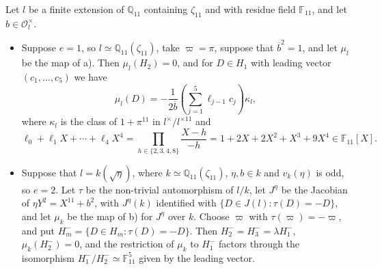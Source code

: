\documentclass[11pt,reqno]{amsart}
\newcommand{\Q}{\mathbb{Q}}
\newcommand{\F}{\mathbb{F}}
\newcommand{\OO}{\mathcal{O}}
\theoremstyle{definition}
\numberwithin{equation}{section}
\begin{document}
\begin{lemma}\label{lem:kummer_formal}
Let $l$ be a finite extension of $\Q_{11}$ containing $\zeta_{11}$ and with residue field $\F_{11}$, and let $b\in\OO_l^\times$.
\begin{itemize}
\item[a)] Suppose $e=1$, so $l\simeq\Q_{11}(\zeta_{11})$, take $\varpi=\pi$, suppose that $\overline b^2=1$, and let $\mu_l$ be the map of  a). Then $\mu_l(H_2)=0$, and for $D\in H_1$ with leading vector $(c_1,\ldots,c_5)$ we have
$$\mu_l(D)=-\frac{1}{2\overline b}\left(\sum_{j=1}^5 \ell_{j-1}c_j\right)\kappa_l,$$
where $\kappa_l$ is the class of $1+\pi^{11}$ in $l^\times/l^{\times 11}$ and
$$\ell_0+\ell_1X+\cdots+\ell_4X^4=\prod_{h\in\{2,3,4,8\}}\frac{X-h}{-h}=1+2X+2X^2+X^3+9X^4\in\F_{11}[X].$$
\item[b)] Suppose that $l=k(\sqrt\eta)$, where $k\simeq\Q_{11}(\zeta_{11})$, $\eta,b\in k$ and $v_k(\eta)$ is odd, so $e=2$. Let $\tau$ be the non-trivial automorphism of $l/k$, let $J^\eta$ be the Jacobian of $\eta Y^2=X^{11}+b^2$, with $J^\eta(k)$ identified with $\{D\in J(l):\tau(D)=-D\}$, and let $\mu_k$ be the map of  b) for $J^\eta$ over $k$. Choose $\varpi$ with $\tau(\varpi)=-\varpi$, and put $H_m^-=\{D\in H_m:\tau(D)=-D\}$. Then $H_2^-=H_3^-=\lambda H_1^-$, $\mu_k(H_2^-)=0$, and the restriction of $\mu_k$ to $H_1^-$ factors through the isomorphism $H_1^-/H_2^-\simeq\F_{11}^5$ given by the leading vector.
\end{itemize}
\end{lemma}
\end{document}
